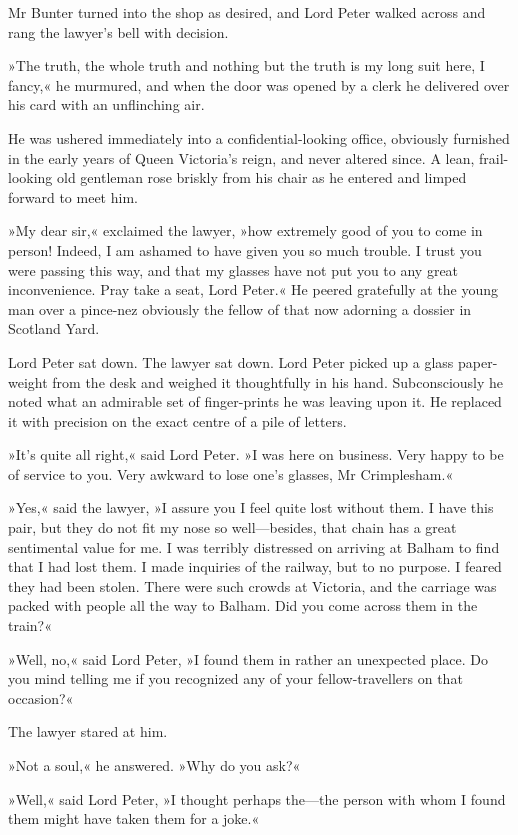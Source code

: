 Mr Bunter turned into the shop as desired, and Lord Peter walked across and rang the lawyer's bell with decision.

»The truth, the whole truth and nothing but the truth is my long suit here, I fancy,« he murmured, and when the door was opened by a clerk he delivered over his card with an unflinching air.

He was ushered immediately into a confidential-looking office, obviously furnished in the early years of Queen Victoria's reign, and never altered since. A lean, frail-looking old gentleman rose briskly from his chair as he entered and limped forward to meet him.

»My dear sir,« exclaimed the lawyer, »how extremely good of you to come in person! Indeed, I am ashamed to have given you so much trouble. I trust you were passing this way, and that my glasses have not put you to any great inconvenience. Pray take a seat, Lord Peter.« He peered gratefully at the young man over a pince-nez obviously the fellow of that now adorning a dossier in Scotland Yard.

Lord Peter sat down. The lawyer sat down. Lord Peter picked up a glass paper-weight from the desk and weighed it thoughtfully in his hand. Subconsciously he noted what an admirable set of finger-prints he was leaving upon it. He replaced it with precision on the exact centre of a pile of letters.

»It's quite all right,« said Lord Peter. »I was here on business. Very happy to be of service to you. Very awkward to lose one's glasses, Mr Crimplesham.«

»Yes,« said the lawyer, »I assure you I feel quite lost without them. I have this pair, but they do not fit my nose so well—besides, that chain has a great sentimental value for me. I was terribly distressed on arriving at Balham to find that I had lost them. I made inquiries of the railway, but to no purpose. I feared they had been stolen. There were such crowds at Victoria, and the carriage was packed with people all the way to Balham. Did you come across them in the train?«

»Well, no,« said Lord Peter, »I found them in rather an unexpected place. Do you mind telling me if you recognized any of your fellow-travellers on that occasion?«

The lawyer stared at him.

»Not a soul,« he answered. »Why do you ask?«

»Well,« said Lord Peter, »I thought perhaps the—the person with whom I found them might have taken them for a joke.«


